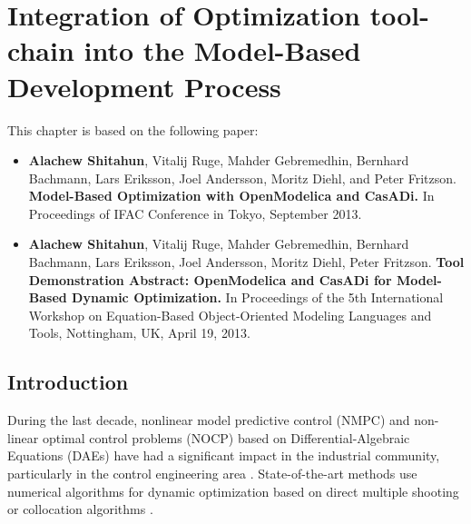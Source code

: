 

\chapter{Integration of Optimization tool-chain into the Model-Based Development Process}
\label{cha:optimization}

This chapter is based on the following paper:

\begin{itemize}
	
	\item \textbf{Alachew Shitahun}, Vitalij Ruge, Mahder Gebremedhin, Bernhard Bachmann, Lars Eriksson, Joel Andersson, Moritz Diehl, and Peter Fritzson. \textbf{Model-Based Optimization with OpenModelica and CasADi.} In Proceedings of IFAC Conference in Tokyo, September 2013. 
	
	\item  \textbf{Alachew Shitahun}, Vitalij Ruge, Mahder Gebremedhin, Bernhard Bachmann, Lars Eriksson, Joel Andersson, Moritz Diehl, Peter Fritzson. \textbf{Tool Demonstration Abstract: OpenModelica and CasADi for Model-Based Dynamic Optimization.} In Proceedings of the 5th International Workshop on Equation-Based Object-Oriented Modeling Languages and Tools, Nottingham, UK, April 19, 2013. 
		
\end{itemize}



\section{Introduction}
\label{sec:optimizationintroduction}

During the last decade, nonlinear model predictive control (NMPC) and non-linear optimal control problems (NOCP)
based on Differential-Algebraic Equations (DAEs) have had a significant impact in the industrial community, particularly in
the control engineering area \cite{biegler, tamimi}. State-of-the-art methods use numerical
algorithms for dynamic optimization based on direct multiple shooting \cite{bock} or collocation algorithms
\cite{biegler}.

